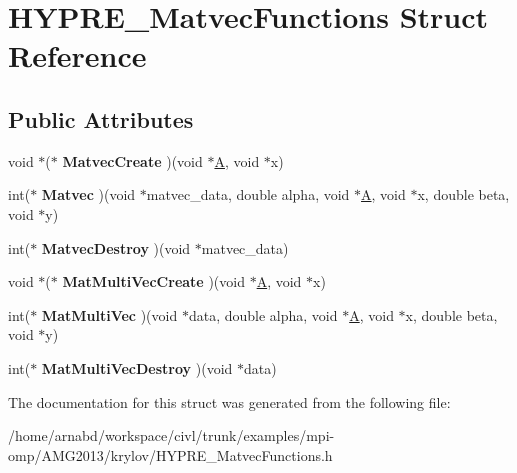 \hypertarget{structHYPRE__MatvecFunctions}{}\section{H\+Y\+P\+R\+E\+\_\+\+Matvec\+Functions Struct Reference}
\label{structHYPRE__MatvecFunctions}
\subsection*{Public Attributes}
\begin{DoxyCompactItemize}
\item 
\hypertarget{structHYPRE__MatvecFunctions_a69f7b4db234d67ce86bc24bdccdef93d}{}void $\ast$($\ast$ {\bfseries Matvec\+Create} )(void $\ast$\hyperlink{structA}{A}, void $\ast$x)\label{structHYPRE__MatvecFunctions_a69f7b4db234d67ce86bc24bdccdef93d}

\item 
\hypertarget{structHYPRE__MatvecFunctions_abbbed8c3677b3a925b5d066aadb87237}{}int($\ast$ {\bfseries Matvec} )(void $\ast$matvec\+\_\+data, double alpha, void $\ast$\hyperlink{structA}{A}, void $\ast$x, double beta, void $\ast$y)\label{structHYPRE__MatvecFunctions_abbbed8c3677b3a925b5d066aadb87237}

\item 
\hypertarget{structHYPRE__MatvecFunctions_a1b38c9870a23d39cced64a583229ade4}{}int($\ast$ {\bfseries Matvec\+Destroy} )(void $\ast$matvec\+\_\+data)\label{structHYPRE__MatvecFunctions_a1b38c9870a23d39cced64a583229ade4}

\item 
\hypertarget{structHYPRE__MatvecFunctions_a3de0081f7097d3923855153fd68cd582}{}void $\ast$($\ast$ {\bfseries Mat\+Multi\+Vec\+Create} )(void $\ast$\hyperlink{structA}{A}, void $\ast$x)\label{structHYPRE__MatvecFunctions_a3de0081f7097d3923855153fd68cd582}

\item 
\hypertarget{structHYPRE__MatvecFunctions_a78d8e78dec6bd0f47a3afd6a455f9fc1}{}int($\ast$ {\bfseries Mat\+Multi\+Vec} )(void $\ast$data, double alpha, void $\ast$\hyperlink{structA}{A}, void $\ast$x, double beta, void $\ast$y)\label{structHYPRE__MatvecFunctions_a78d8e78dec6bd0f47a3afd6a455f9fc1}

\item 
\hypertarget{structHYPRE__MatvecFunctions_a5046cbf2d2e485009ffe7e33f9d65f86}{}int($\ast$ {\bfseries Mat\+Multi\+Vec\+Destroy} )(void $\ast$data)\label{structHYPRE__MatvecFunctions_a5046cbf2d2e485009ffe7e33f9d65f86}

\end{DoxyCompactItemize}


The documentation for this struct was generated from the following file\+:\begin{DoxyCompactItemize}
\item 
/home/arnabd/workspace/civl/trunk/examples/mpi-\/omp/\+A\+M\+G2013/krylov/H\+Y\+P\+R\+E\+\_\+\+Matvec\+Functions.\+h\end{DoxyCompactItemize}
